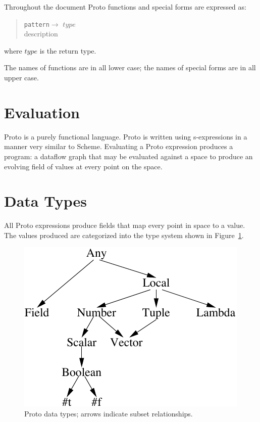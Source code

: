 \documentclass{article}
\newcommand\function[3]
{\begin{quote}{\tt #1}$\rightarrow$ \type{#2} \\ #3 \end{quote}}
\newcommand\type[1]{$#1$}
\begin{document}
Throughout the document Proto functions and special forms are
expressed as: 
\function{pattern}{type}{description}
where \type{type} is the return type.

The names of functions are in all lower case; the names of special
forms are in all upper case.


\section{Evaluation}

Proto is a purely functional language.  Proto is written using
s-expressions in a manner very similar to Scheme.  Evaluating a Proto
expression produces a program: a dataflow graph that may be evaluated
against a space to produce an evolving field of values at every point
on the space.


\section{Data Types}

All Proto expressions produce fields that map every point in space to
a value.  The values produced are categorized into the type system
shown in Figure~\ref{f:types}.

\begin{figure}[hp]
\centering
\includegraphics{figures/types.pdf}
\caption{Proto data types; arrows indicate subset relationships.}
\label{f:types}
\end{figure}
\end{document}
